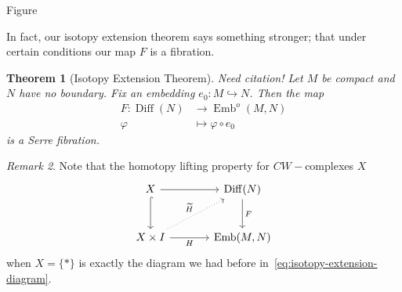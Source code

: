 \documentclass{amsart}
\DeclareMathOperator{\Emb}{Emb}
\DeclareMathOperator{\Diff}{Diff}
\newtheorem{theorem}{Theorem}[section]
\theoremstyle{definition}
\theoremstyle{remark}
\newtheorem{remark}[theorem]{Remark}
\theoremstyle{example}
\begin{document}
\begin{center}
\par\smallskip
{}\label{fig:ambient-isotopy}
Figure~\thefigure
\end{center}

In fact, our isotopy extension theorem says something stronger; that under certain conditions our map $F$ is a fibration.

\begin{theorem}[Isotopy Extension Theorem]
    Need citation! Let $M$ be compact and $N$ have no boundary. Fix an embedding $e_0 \colon M \hookrightarrow N$. Then the map
    \[
    \begin{aligned}
        F \colon \Diff(N) &\to \Emb^o(M,N) \\
        \varphi &\mapsto \varphi \circ e_0
    \end{aligned}
    \]
    is a Serre fibration.
\end{theorem}

\begin{remark}
    Note that the homotopy lifting property for $CW-$complexes $X$
    \[
    \begin{tikzcd}[row sep=large, column sep=large]
    X \arrow[d, hook] \arrow[r] & \Diff(N) \arrow[d, "F"] \\
    X \times I \arrow[r, "H"'] \arrow[ur, dotted, "\widetilde H"] & \Emb(M,N)
    \end{tikzcd}
    \]
    when $X = \{ * \}$ is exactly the diagram we had before in~\eqref{eq:isotopy-extension-diagram}.
\end{remark}
\end{document}
